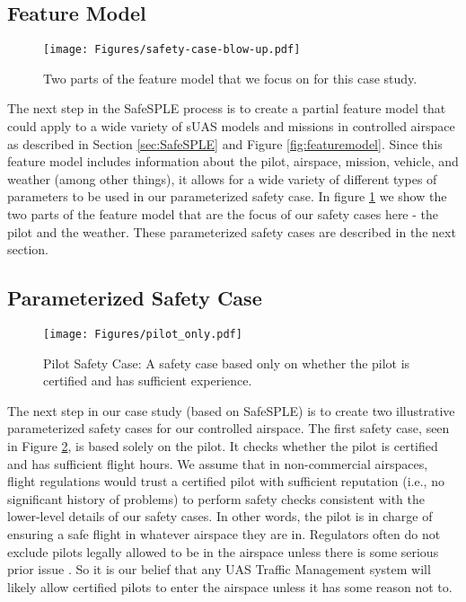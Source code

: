 \subsection{Feature Model}

\begin{figure}[ht]
    \centering
    \texttt{[image: Figures/safety-case-blow-up.pdf]}
    \caption{Two parts of the feature model that we focus on for this case study.}
    \label{fig:feature_model_focus}
\end{figure}

The next step in the SafeSPLE process is to create a partial feature model that could apply to a wide variety of sUAS models and missions in controlled airspace as described in Section \ref{sec:SafeSPLE} and Figure \ref{fig:featuremodel}. Since this feature model includes information about the pilot, airspace, mission, vehicle, and weather (among other things), it allows for a wide variety of different types of parameters to be used in our parameterized safety case. In figure \ref{fig:feature_model_focus} we show the two parts of the feature model that are the focus of our safety cases here - the pilot and the weather. These parameterized safety cases are described in the next section. 


\subsection{Parameterized Safety Case}

\begin{figure}[ht]
    \centering
    \texttt{[image: Figures/pilot\_only.pdf]}
    \caption{Pilot Safety Case: A safety case based only on whether the pilot is certified and has sufficient experience.}
    \label{fig:pilot_only}
\end{figure}

The next step in our case study (based on SafeSPLE) is to create two illustrative parameterized safety cases for our controlled airspace. The first safety case, seen in Figure \ref{fig:pilot_only}, is based solely on the pilot. It checks whether the pilot is certified and has sufficient flight hours. We assume that in non-commercial airspaces, flight regulations would trust a certified pilot with sufficient reputation (i.e., no significant history of problems) to perform safety checks consistent with the lower-level details of our safety cases. In other words, the pilot is in charge of ensuring a safe flight in whatever airspace they are in. Regulators often do not exclude pilots legally allowed to be in the airspace unless there is some serious prior issue \cite{FAA_TRUST, FAA_part107}. So it is our belief that any UAS Traffic Management system will likely allow certified pilots to enter the airspace unless it has some reason not to.

